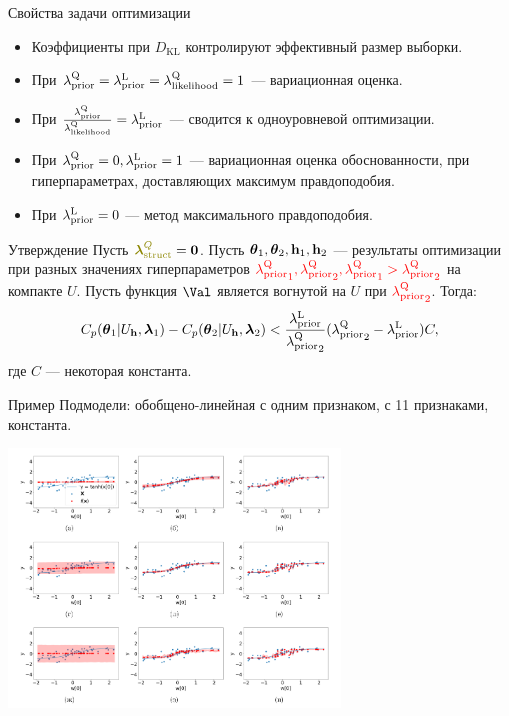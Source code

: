 \documentclass[10pt,pdf,utf8,russian,aspectratio=169]{beamer}
\begin{document}
\begin{frame}{Свойства задачи оптимизации}
\begin{itemize}
\item Коэффициенты при ${D}_\text{KL}$ контролируют эффективный размер выборки.
\item При $\lambda_\text{prior}^\text{Q}  = \lambda_\text{prior}^\text{L} = \lambda_\text{likelihood}^\text{Q} = 1$ --- вариационная оценка.
\item При $\frac{\lambda_\text{prior}^\text{Q}}{\lambda_\text{likelihood}^\text{Q}} = \lambda_\text{prior}^\text{L}$ --- сводится к одноуровневой оптимизации.
\item При $\lambda_\text{prior}^\text{Q} = 0, \lambda_\text{prior}^\text{L} = 1$ --- вариационная оценка обоснованности, при гиперпараметрах, доставляющих максимум правдоподобия.
\item При $\lambda_\text{prior}^\text{L} = 0$ --- метод максимального правдоподобия.
\end{itemize}

\begin{block}{Утверждение}
Пусть $\textcolor{olive}{\boldsymbol{\lambda}^Q_{\text{struct}}} = \bf 0$.
Пусть  $\boldsymbol{\theta}_1, \boldsymbol{\theta}_2, \mathbf{h}_1, \mathbf{h}_2$ --- результаты оптимизации при разных значениях гиперпараметров $\textcolor{red}{{\lambda_\text{prior}^\text{Q}}_1,{\lambda_\text{prior}^\text{Q}}_2, {\lambda_\text{prior}^\text{Q}}_1>{\lambda_\text{prior}^\text{Q}}_2}$ на компакте $U$.
Пусть функция $\Val$ является вогнутой на $U$ при $\textcolor{red}{{\lambda_\text{prior}^\text{Q}}_2}$.
Тогда:
\footnotesize
\vspace{-0.2cm}
\[
    C_p(\boldsymbol{\theta}_1|U_{\mathbf{h}}, \boldsymbol{\lambda}_1) - C_p(\boldsymbol{\theta}_2|U_{\mathbf{h}}, \boldsymbol{\lambda}_2)  < \frac{\lambda_\text{prior}^\text{L} }{{\lambda_\text{prior}^\text{Q}}_2} ({\lambda_\text{prior}^\text{Q}}_2- \lambda_\text{prior}^\text{L}) C,
\]
где $C$ --- некоторая константа.
\end{block}


\end{frame}

\begin{frame}{Пример}
Подмодели: обобщено-линейная с одним признаком, с 11 признаками, константа.
\begin{center}
\includegraphics[width=0.66\textwidth]{example.png}
\end{center}
\end{frame}
\end{document}
